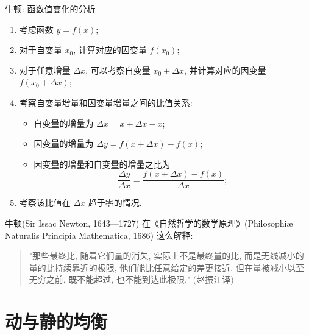 \documentclass[
10pt,
aspectratio=43,
]{beamer}
\begin{document}
\begin{frame}{牛顿: 函数值变化的分析}
    \begin{block}{}
        \begin{enumerate}
            \item   考虑函数 $y=f(x)$;
            \item 	对于自变量 $x_0$, 计算对应的因变量 $f(x_0)$;
            \item 	对于任意增量 $\Delta x$, 可以考察自变量 $x_0+\Delta x$, 并计算对应的因变量 $f(x_0+\Delta x)$;
            \item  	考察自变量增量和因变量增量之间的比值关系:
                  \begin{itemize}
                      \item 自变量的增量为 $\Delta x = x+\Delta x -x$;
                      \item 因变量的增量为 $\Delta y = f(x+\Delta x) -f(x)$;
                      \item 因变量的增量和自变量的增量之比为
                            $$
                                \frac{\Delta y}{\Delta x} = \frac{f(x+\Delta x) -f(x)}{\Delta x};
                            $$
                  \end{itemize}
            \item  考察该比值在 $\Delta x$ 趋于零的情况.
        \end{enumerate}
    \end{block}
    \pause
    {\small	牛顿(Sir Issac Newton, 1643—1727) 在《自然哲学的数学原理》(Philosophiæ Naturalis Principia Mathematica, 1686) 这么解释:
        \pause
        \begin{quote}
            "那些最终比, 随着它们量的消失, 实际上不是最终量的比, 而是无线减小的量的比持续靠近的极限, 他们能比任意给定的差更接近. 但在量被减小以至无穷之前, 既不能超过, 也不能到达此极限." (赵振江译)
        \end{quote}
    }
\end{frame}


\section{动与静的均衡}
\end{document}
